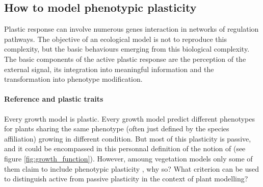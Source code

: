 \subsection{How to model phenotypic plasticity}

Plastic response can involve numerous genes interaction in networks of regulation pathways. The objective of an ecological model is not to reproduce this complexity, but the basic behaviours emerging from this biological complexity. The basic components of the active plastic response are the perception of the external signal, its integration into meaningful information and the transformation into phenotype modification.

\paragraph{Reference and plastic traits}

Every growth model is plastic. Every growth model predict different phenotypes for plants sharing the  same phenotype (often just defined by the species affiliation) growing in different condition. But most of this plasticity is passive, and it could be encompassed in this personnal definition of the notion of  (see figure \ref{fig:growth_function}). However, amoung vegetation models only some of them claim to include phenotypic plasticity \parencite{maire_plasticity_2013}, why so? What criterion can be used to distinguish active from passive plasticity in the context of plant modelling?

